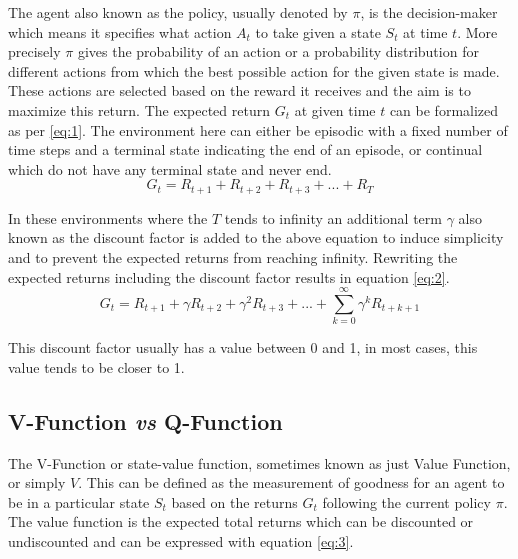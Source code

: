 The agent also known as the policy, usually denoted by $\pi$, is the decision-maker which means it specifies what action $A_t$ to take given a state $S_t$ at time $t$. More precisely $\pi$ gives the probability of an action or a probability distribution for different actions from which the best possible action for the given state is made. These actions are selected based on the reward it receives and the aim is to maximize this return. The expected return $G_t$ at given time $t$ can be formalized as per \ref{eq:1}. The environment here can either be episodic with a fixed number of time steps and a terminal state indicating the end of an episode, or continual which do not have any terminal state and never end. \\

\begin{equation}\label{eq:1}
    G_t = R_{t+1} + R_{t+2} + R_{t+3} + ... + R_T
\end{equation}

In these environments where the $T$ tends to infinity an additional term $\gamma$ also known as the discount factor is added to the above equation to induce simplicity and to prevent the expected returns from reaching infinity. Rewriting the expected returns including the discount factor results in equation \ref{eq:2}. \\

\begin{equation}\label{eq:2}
    G_t = R_{t+1} + \gamma R_{t+2} + \gamma^{2} R_{t+3} + ... + \sum_{k=0}^{\infty} \gamma^{k} R_{t+k+1}
\end{equation}

This discount factor usually has a value between 0 and 1, in most cases, this value tends to be closer to 1. \\

\subsection{V-Function \textit{vs} Q-Function}

The V-Function or state-value function, sometimes known as just Value Function, or simply $V$. This can be defined as the measurement of goodness for an agent to be in a particular state $S_t$ based on the returns $G_t$ following the current policy $\pi$. The value function is the expected total returns which can be discounted or undiscounted and can be expressed with equation \ref{eq:3}. \\

